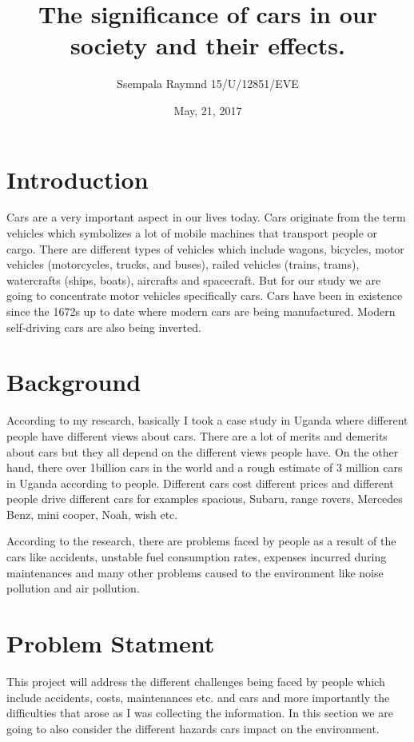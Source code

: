 \documentclass[12pt]{article}
\begin{document}
\title{The significance of cars in our society and their effects.}
\author{Ssempala Raymnd 15/U/12851/EVE}
\date{May, 21, 2017}
\maketitle

\section{Introduction}
Cars are a very important aspect in our lives today. Cars originate from the term vehicles which symbolizes a lot of mobile machines that transport people or cargo. There are different types of vehicles which include wagons, bicycles, motor vehicles (motorcycles, trucks, and buses), railed vehicles (trains, trams), watercrafts (ships, boats), aircrafts and spacecraft. But for our study we are going to concentrate motor vehicles specifically cars. Cars have been in existence since the 1672s up to date where modern cars are being manufactured. Modern self-driving cars are also being inverted.

\section{Background}
According to my research, basically I took a case study in Uganda where different people have different views about cars. There are a lot of merits and demerits about cars but they all depend on the different views people have.
On the other hand, there over 1billion cars in the world and a rough estimate of 3 million cars in Uganda according to people.  Different cars cost different prices and different people drive different cars for examples spacious, Subaru, range rovers, Mercedes Benz, mini cooper, Noah, wish etc. 

According to the research, there are problems faced by people as a result of the cars like accidents, unstable fuel consumption rates, expenses incurred during maintenances and many other problems caused to the environment like noise pollution and air pollution.

\section{Problem Statment}
This project will address the different challenges being faced by people which include accidents, costs, maintenances etc. and cars and more importantly the difficulties that arose as I was collecting the information.
In this section we are going to also consider the different hazards cars impact on the environment.
\end{document}
